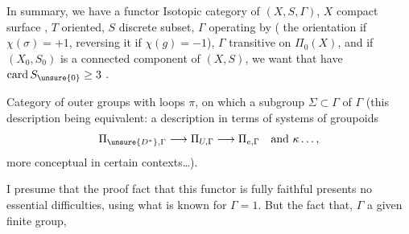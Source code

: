 In summary, we have a  functor
Isotopic category of \((X,S,\Gamma)\), \(X\) compact surface ,
\(T\) oriented, \(S\) discrete subset, \(\Gamma\) operating by 
(\inserted{\(\sigma\in\Gamma\)} the orientation if \(\chi(\sigma)=+1\), reversing it
if \(\chi(g)=-1\)), \(\Gamma\) transitive on \(\Pi_0(X)\),
 and if \((X_0,S_0)\) is a connected component
of \((X,S)\), we want that 
have \(\operatorname{card} S_{\unsure{0}}\geq 3\) .

\diagram{\begin{tikzcd}[row sep=2.5em]
{} \arrow[d] \\
{}
\end{tikzcd}}

Category of outer groups with loops \(\pi\),
on which a subgroup \(\Sigma\subset\Gamma\) of \(\Gamma\) 
(this description being
equivalent: a description in terms
of systems of groupoids
\[
\Pi_{\unsure{D^*},\Gamma}\longrightarrow\Pi_{U,\Gamma}
\longrightarrow\Pi_{e,\Gamma}\quad\text{and }\kappa\ldots,
\]
more conceptual in certain contexts\ldots).

 I presume that the proof
 fact that this functor is fully faithful
presents no essential difficulties,
using what is known for
\(\Gamma=1\). But the fact that,  \(\Gamma\) a given finite
group, 

